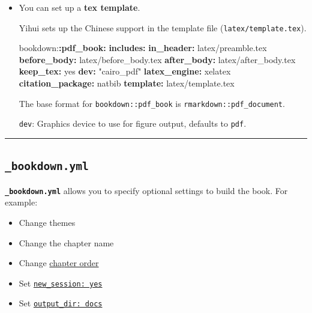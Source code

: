 \documentclass[
  a4paper,
  twoside,
  openright]{book}
\newenvironment{Shaded}{\begin{snugshade}}{\end{snugshade}}
\newcommand{\AttributeTok}[1]{\textcolor[rgb]{0.13,0.29,0.53}{#1}}
\newcommand{\CharTok}[1]{\textcolor[rgb]{0.31,0.60,0.02}{#1}}
\newcommand{\FunctionTok}[1]{\textcolor[rgb]{0.13,0.29,0.53}{\textbf{#1}}}
\newcommand{\KeywordTok}[1]{\textcolor[rgb]{0.13,0.29,0.53}{\textbf{#1}}}
\newcommand{\StringTok}[1]{\textcolor[rgb]{0.31,0.60,0.02}{#1}}
\providecommand{\tightlist}{%
  \setlength{\itemsep}{0pt}\setlength{\parskip}{0pt}}
\theoremstyle{definition}
\theoremstyle{definition}
\theoremstyle{definition}
\theoremstyle{definition}
\theoremstyle{remark}
\begin{document}
\begin{itemize}
\item
  You can set up a \textbf{tex template}.

  Yihui sets up the Chinese support in the template file (\texttt{latex/template.tex}).

\begin{Shaded}
\begin{Highlighting}[]
\AttributeTok{bookdown:}\FunctionTok{:pdf\_book}\KeywordTok{:}
\AttributeTok{  }\FunctionTok{includes}\KeywordTok{:}
\AttributeTok{    }\FunctionTok{in\_header}\KeywordTok{:}\AttributeTok{ latex/preamble.tex}
\AttributeTok{    }\FunctionTok{before\_body}\KeywordTok{:}\AttributeTok{ latex/before\_body.tex}
\AttributeTok{    }\FunctionTok{after\_body}\KeywordTok{:}\AttributeTok{ latex/after\_body.tex}
\AttributeTok{  }\FunctionTok{keep\_tex}\KeywordTok{:}\AttributeTok{ }\CharTok{yes}
\AttributeTok{  }\FunctionTok{dev}\KeywordTok{:}\AttributeTok{ }\StringTok{"cairo\_pdf"}
\AttributeTok{  }\FunctionTok{latex\_engine}\KeywordTok{:}\AttributeTok{ xelatex}
\AttributeTok{  }\FunctionTok{citation\_package}\KeywordTok{:}\AttributeTok{ natbib}
\AttributeTok{  }\FunctionTok{template}\KeywordTok{:}\AttributeTok{ latex/template.tex}
\end{Highlighting}
\end{Shaded}

  The base format for \texttt{bookdown::pdf\_book} is \texttt{rmarkdown::pdf\_document}.

  \texttt{dev}: Graphics device to use for figure output, defaults to \texttt{pdf}.
\end{itemize}

\begin{center}\rule{0.5\linewidth}{0.5pt}\end{center}

\subsection*{\texorpdfstring{\texttt{\_bookdown.yml}}{\_bookdown.yml}}\label{bookdown.yml}

\textbf{\texttt{\_bookdown.yml}} allows you to specify optional settings to build the book. For example:

\begin{itemize}
\tightlist
\item
  Change themes
\item
  Change the chapter name
\item
  Change \href{https://rstudio4edu.github.io/rstudio4edu-book/book-yours.html\#book-order}{chapter order}
\item
  Set \href{https://rstudio4edu.github.io/rstudio4edu-book/make-book.html\#book-output}{\texttt{new\_session:\ yes}}
\item
  Set \href{https://rstudio4edu.github.io/rstudio4edu-book/make-book.html\#book-output}{\texttt{output\_dir:\ docs}}
\end{itemize}
\end{document}
